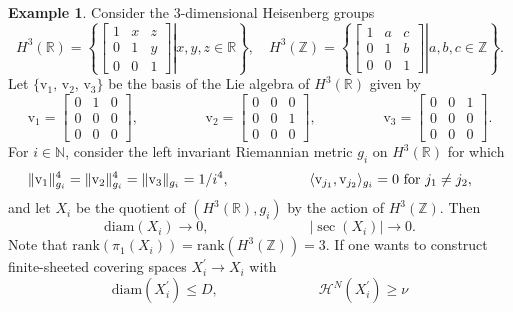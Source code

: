 \documentclass[12pt]{amsart}
\theoremstyle{definition}
\def\fnum{equation}
\newtheorem{example}[\fnum]{Example}
\numberwithin{equation}{section}
\newcommand{\rank}{{\text{rank}}}
\newcommand{\diam}{{\text {diam}}}
\newcommand{\vv}{\text{v}}
\newcommand{\haus}{\mathcal{H}}
\newcommand{\R}{\mathbb{R}}
\newcommand{\Z}{\mathbb{Z}}
\begin{document}
\begin{example}
Consider the $3$-dimensional Heisenberg groups
\[
H^3(\R)=\left\{ \left. \begin{bmatrix}
    1 & x & z\\
    0 & 1 & y\\
    0 & 0 & 1
\end{bmatrix} \right| x,y,z \in \R \right \}, \quad H^3(\Z)=\left\{\left. \begin{bmatrix}
    1 & a & c\\
    0 & 1 & b\\
    0 & 0 & 1
\end{bmatrix}\right| a,b,c\in \Z \right\}.
\]
Let $\{ \vv _1, \, \vv _2, \, \vv _3 \} $ be the basis of the Lie algebra of $H^3(\R)$ given by
\[
\vv_1= \begin{bmatrix}
    0 & 1 & 0\\
    0 & 0 & 0\\
    0 & 0 & 0
\end{bmatrix} ,
\hspace{2cm}
\vv_2= \begin{bmatrix}
    0 & 0 & 0\\
    0 & 0 & 1\\
    0 & 0 & 0
\end{bmatrix} ,
\hspace{2cm}
\vv_3= \begin{bmatrix}
    0 & 0 & 1\\
    0 & 0 & 0\\
    0 & 0 & 0
\end{bmatrix}.
\]
For $ i  \in \mathbb{N}$, consider the left invariant Riemannian metric $g_i$ on $H^3 (\mathbb{R})$ for which
\begin{gather*}
    \Vert \vv _1 \Vert _{g_i} ^4  = \Vert \vv _2 \Vert _{g_i} ^4 = \Vert \vv _3 \Vert _{g_i}  = 1/ i ^4 , \hspace{2cm}     \langle \vv _{j_1} , \vv_{j_2} \rangle _{g_i} = 0 \text{ for } j_1 \neq j_2 ,  \hspace{0.5cm} 
\end{gather*}   
and let $X_i$ be the quotient of $(H^3(\mathbb{R}), g_i)$ by the action of $H^3(\Z)$. Then 
\[      \diam (X _i) \to 0 , \hspace{3cm}  |\sec ( X_i)  | \to 0 . \] 
Note that $\rank ( \pi _1 (X_i)) = \rank (H^3(\Z))=3$.   If one wants to construct finite-sheeted covering spaces $X_i ^{\prime } \to X_i $ with 
\[ \diam (X_i^{\prime}) \leq D , \hspace{3cm} \haus ^N (X_i^{\prime}) \geq \nu  \]

\end{example}
\end{document}
